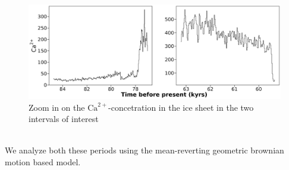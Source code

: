 \begin{figure}[h!]
    \begin{center}
    \includegraphics[scale = .075]{figures/ice_core_zoom_plot.jpeg}
    \caption{Zoom in on the $\mathrm{Ca}^{2+}$-concetration in the ice sheet in the two intervals of interest}
    \label{figure:Ca_icesheet}
    \end{center}
\end{figure}\\
We analyze both these periods using the mean-reverting geometric brownian motion based model.